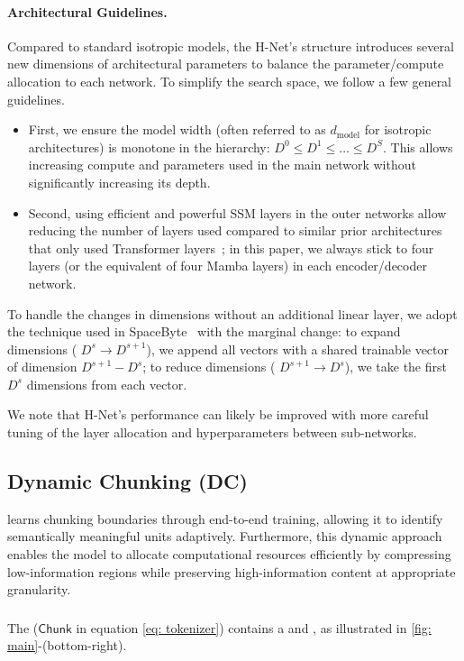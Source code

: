 \paragraph{Architectural Guidelines.}
Compared to standard isotropic models, the H-Net's structure introduces several new dimensions of architectural parameters to balance the parameter/compute allocation to each network.
To simplify the search space, we follow a few general guidelines.
\begin{itemize}
    \item  First, we ensure the model width (often referred to as $d_{\text{model}}$ for isotropic architectures) is monotone in the hierarchy: $D^0 \leq D^1 \leq \dots \leq D^S$.
    This allows increasing compute and parameters used in the main network without significantly increasing its depth.
    \item Second, using efficient and powerful SSM layers in the outer networks allow reducing the number of layers used compared to similar prior architectures that only used Transformer layers~\citep{SpaceByte};
    in this paper, we always stick to four layers (or the equivalent of four Mamba layers) in each encoder/decoder network.
\end{itemize}
To handle the changes in dimensions without an additional linear layer, we adopt the technique used in SpaceByte~\citep{SpaceByte} with the marginal change: to expand dimensions (\ie{} $D^{s} \rightarrow D^{s+1}$), we append all vectors with a shared trainable vector of dimension $D^{s+1}-D^{s}$; to reduce dimensions (\ie{} $D^{s+1} \rightarrow D^{s}$), we take the first $D^{s}$ dimensions from each vector.

We note that H-Net's performance can likely be improved with more careful tuning of the layer allocation and hyperparameters between sub-networks.


\subsection{Dynamic Chunking (DC)}
\label{sec: Method-Dynamic-Chunking-Mechanism}

\model{} learns chunking boundaries through end-to-end training, allowing it to identify semantically meaningful units adaptively.
Furthermore, this dynamic approach enables the model to allocate computational resources efficiently by compressing low-information regions while preserving high-information content at appropriate granularity.

\subsubsection{\CHUNK{}}
\label{sec: tokenizer}
The \chunk{} ($\mathsf{Chunk}$ in equation \eqref{eq: tokenizer}) contains a \router{} and \downsampler{}, as illustrated in \cref{fig: main}-(\colorbox{Chunk}{bottom-right}).

